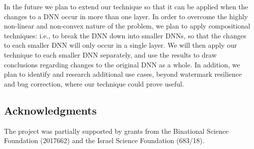 \documentclass{easychair}
\newcommand{\guy}[1]{\marginpar{\textcolor{orange}{Guy: #1}}}
\begin{document}
In the future we plan to extend our technique so that it can be
applied when the changes to a DNN occur in more than one layer. In
order to overcome the highly non-linear and non-convex nature of the
problem, we plan to apply compositional techniques: i.e., to break the DNN
down into smaller DNNs, so that the changes to each smaller DNN will only occur in
a single layer. We will then apply our technique to each smaller DNN
separately, and use the results to draw conclusions regarding changes
to the original DNN as a whole. In addition, we plan to identify and  research additional
use cases, beyond watermark resilience and bug correction, where our technique
could prove useful.

\subsection*{Acknowledgments}
The project was partially supported by grants from the Binational Science
Foundation (2017662) and the Israel Science Foundation (683/18).

\guy{TODO: Ask the Yossis for additional acks}



\end{document}
